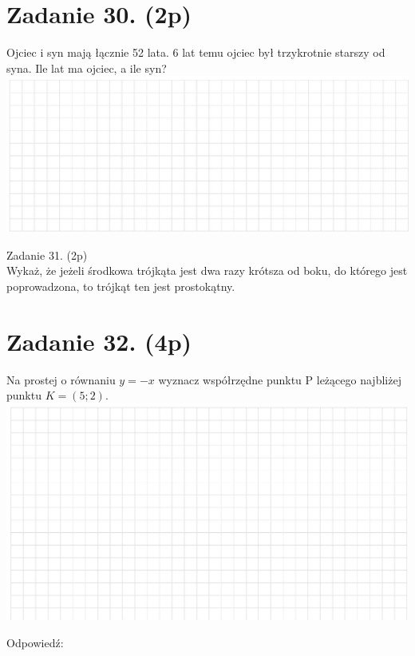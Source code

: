 \documentclass[10pt]{article}
\begin{document}
\section*{Zadanie 30. (2p)}
Ojciec i syn mają łącznie 52 lata. 6 lat temu ojciec był trzykrotnie starszy od syna. Ile lat ma ojciec, a ile syn?\\
\includegraphics[max width=\textwidth, center]{2024_11_21_b63ac6eb3d78a57ac924g-10(1)}

Zadanie 31. (2p)\\
Wykaż, że jeżeli środkowa trójkąta jest dwa razy krótsza od boku, do którego jest poprowadzona, to trójkąt ten jest prostokątny.

\section*{Zadanie 32. (4p)}
Na prostej o równaniu \(y=-x\) wyznacz współrzędne punktu P leżącego najbliżej punktu \(K=(5 ; 2)\).\\
\includegraphics[max width=\textwidth, center]{2024_11_21_b63ac6eb3d78a57ac924g-11(1)}

Odpowiedź:
\end{document}

